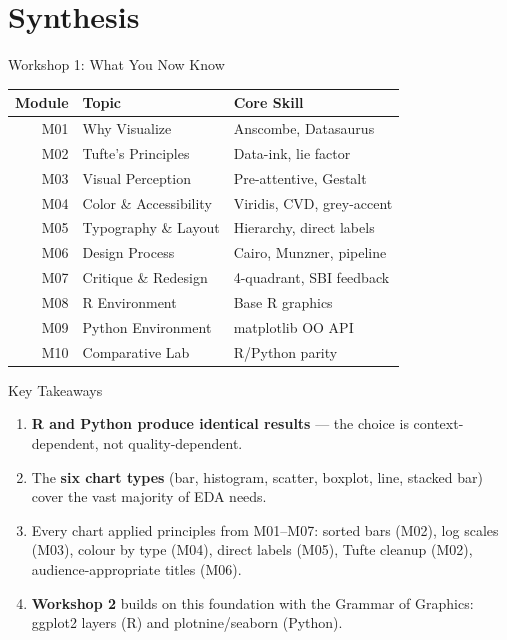\documentclass[10pt]{beamer}
\begin{document}
\section{Synthesis}

\begin{frame}{Workshop 1: What You Now Know}
  \centering
  \begin{tabular}{rlp{5cm}}
    \toprule
    \textbf{Module} & \textbf{Topic} & \textbf{Core Skill} \\
    \midrule
    M01 & Why Visualize           & Anscombe, Datasaurus \\
    M02 & Tufte's Principles      & Data-ink, lie factor \\
    M03 & Visual Perception       & Pre-attentive, Gestalt \\
    M04 & Color \& Accessibility  & Viridis, CVD, grey-accent \\
    M05 & Typography \& Layout    & Hierarchy, direct labels \\
    M06 & Design Process          & Cairo, Munzner, pipeline \\
    M07 & Critique \& Redesign    & 4-quadrant, SBI feedback \\
    M08 & R Environment           & Base R graphics \\
    M09 & Python Environment      & matplotlib OO API \\
    M10 & Comparative Lab         & R/Python parity \\
    \bottomrule
  \end{tabular}
\end{frame}

\begin{frame}{Key Takeaways}
  \begin{enumerate}
    \item \textbf{R and Python produce identical results} --- the choice
          is context-dependent, not quality-dependent.
    \item The \textbf{six chart types} (bar, histogram, scatter, boxplot,
          line, stacked bar) cover the vast majority of EDA needs.
    \item Every chart applied principles from M01--M07: sorted bars (M02),
          log scales (M03), colour by type (M04), direct labels (M05),
          Tufte cleanup (M02), audience-appropriate titles (M06).
    \item \textbf{Workshop 2} builds on this foundation with the Grammar
          of Graphics: ggplot2 layers (R) and plotnine/seaborn (Python).
  \end{enumerate}
\end{frame}
\end{document}
